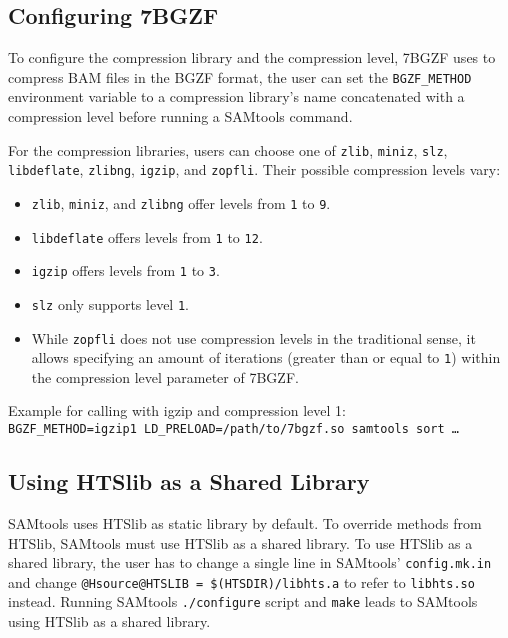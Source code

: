 \subsection{Configuring 7BGZF}\label{7bgzfConfig}

To configure the compression library and the compression level, 7BGZF uses to compress BAM files in the BGZF format, the user can set the \texttt{BGZF\_METHOD} environment variable to a compression library's name concatenated with a compression level before running a SAMtools command. 

For the compression libraries, users can choose one of {\texttt{zlib}}, {\texttt{miniz}}, {\texttt{slz}}, {\texttt{libdeflate}}, {\texttt{zlibng}}, {\texttt{igzip}}, and {\texttt{zopfli}}. Their possible compression levels vary:

\begin{itemize}
\itemsep 0mm
    \item {\texttt{zlib}}, {\texttt{miniz}}, and {\texttt{zlibng}} offer levels from \texttt{1} to \texttt{9}.
    \item {\texttt{libdeflate}} offers levels from \texttt{1} to \texttt{12}.
    \item {\texttt{igzip}} offers levels from \texttt{1} to \texttt{3}.
    \item {\texttt{slz}} only supports level \texttt{1}.
    \item While {\texttt{zopfli}} does not use compression levels in the traditional sense, it allows specifying an amount of iterations (greater than or equal to \texttt{1}) within the compression level parameter of 7BGZF.
\end{itemize}

Example for calling \sort with igzip and compression level 1: \\
\texttt{BGZF\_METHOD=igzip1 LD\_PRELOAD=/path/to/7bgzf.so samtools sort …}

\subsection{Using HTSlib as a Shared Library}\label{shared}

SAMtools uses HTSlib as static library by default. To override methods from HTSlib, SAMtools must use HTSlib as a shared library.
To use HTSlib as a shared library, the user has to change a single line in SAMtools' \texttt{config.mk.in} and change \texttt{@Hsource@HTSLIB = \$(HTSDIR)/libhts.a} to refer to \texttt{libhts.so} instead. Running SAMtools \texttt{./configure} script and \texttt{make} leads to SAMtools using HTSlib as a shared library.


